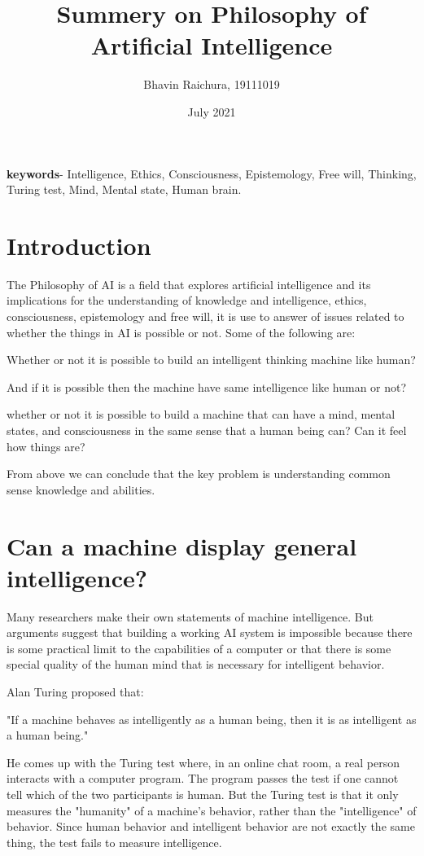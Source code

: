 \documentclass{article}
\title{Summery on Philosophy of  Artificial Intelligence}
\author{Bhavin Raichura, 19111019}
\date{July 2021}
\begin{document}
\maketitle

\begin{keyword}
\textbf{keywords}- Intelligence, Ethics, Consciousness, Epistemology, Free will, Thinking, Turing test, Mind, Mental state, Human brain.

\end{keyword}

\section{Introduction}
The Philosophy of AI is a field that explores artificial intelligence and its implications for the understanding of knowledge and intelligence, ethics, consciousness, epistemology and free will, it is use to answer of issues related to whether the things in AI is possible or not. Some of the following are:
\item Whether or not it is possible to build an intelligent thinking machine like human? 
\item And if it is possible then the machine have same intelligence like human or not? 
\item whether or not it is possible to build a machine that can have a mind, mental states, and consciousness in the same sense that a human being can? Can it feel how things are?
\item From above we can conclude that the key problem is understanding common sense knowledge and abilities. 



\section{Can a machine display general intelligence?}
Many researchers make their own statements of machine intelligence. But arguments suggest that building a working AI system is impossible because there is some practical limit to the capabilities of a computer or that there is some special quality of the human mind that is necessary for intelligent behavior.

\item Alan Turing proposed that: 

"If a machine behaves as intelligently as a human being, then it is as intelligent as a human being."

He comes up with the Turing test where, in an online chat room, a real person interacts with a computer program. The program passes the test if one cannot tell which of the two participants is human.
But the Turing test is that it only measures the "humanity" of a machine's behavior, rather than the "intelligence" of behavior. Since human behavior and intelligent behavior are not exactly the same thing, the test fails to measure intelligence.
\end{document}
